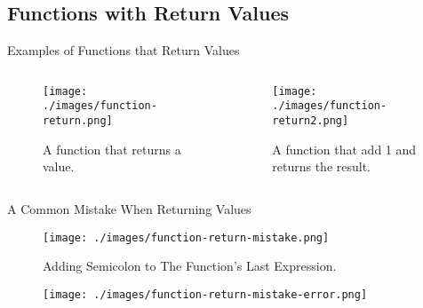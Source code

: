 \documentclass[10pt]{beamer}
\begin{document}
\subsection{Functions with Return Values}
\begin{frame}{Examples of Functions that Return Values}
    \begin{columns}
        \begin{column}{0.5\textwidth}
            \vspace*{-3mm}
            \begin{figure}[htpb]
                \centering
                \texttt{[image: ./images/function-return.png]}
                \caption{A function that returns a value.\cite{rust-book}}
            \end{figure}

        \end{column}
        \begin{column}{0.5\textwidth}
            \begin{figure}[htpb]
                \centering
                \texttt{[image: ./images/function-return2.png]}
                \caption{A function that add 1 and returns the result.\cite{rust-book}}
            \end{figure}

        \end{column}
    \end{columns}

\end{frame}

\begin{frame}{A Common Mistake When Returning Values}
    \begin{figure}[htpb]
        \centering
        \texttt{[image: ./images/function-return-mistake.png]}
        \vspace*{-2mm}
        \caption{Adding Semicolon to The Function's Last Expression.\cite{rust-book}}
    \end{figure}

    \vspace*{-3mm}
    \begin{figure}[htpb]
        \centering
        \texttt{[image: ./images/function-return-mistake-error.png]}
    \end{figure}
\end{frame}
\end{document}

